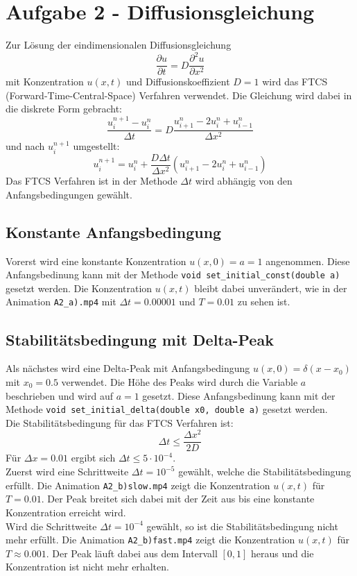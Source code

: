 \section{Aufgabe 2 - Diffusionsgleichung}
\label{sec:A2}
Zur Lösung der eindimensionalen Diffusionsgleichung
\begin{equation}
    \frac{\partial u}{\partial t} = D \frac{\partial^2 u}{\partial x^2}
\end{equation}
mit Konzentration $u(x,t)$ und Diffusionskoeffizient $D=1$ wird das FTCS (Forward-Time-Central-Space) Verfahren verwendet.
Die Gleichung wird dabei in die diskrete Form gebracht:
\begin{equation}
    \frac{u_{i}^{n+1}-u_{i}^{n}}{\Delta t} = D \frac{u_{i+1}^{n}-2u_{i}^{n}+u_{i-1}^{n}}{\Delta x^2}
\end{equation}
und nach $u_{i}^{n+1}$ umgestellt:
\begin{equation}
    u_{i}^{n+1} = u_{i}^{n} + \frac{D \Delta t}{\Delta x^2} (u_{i+1}^{n}-2u_{i}^{n}+u_{i-1}^{n})
\end{equation}
Das FTCS Verfahren ist in der Methode $\Delta t$ wird abhängig von den Anfangsbedingungen gewählt.

\subsection{Konstante Anfangsbedingung}
Vorerst wird eine konstante Konzentration $u(x,0)=a=1$ angenommen.
Diese Anfangsbedinung kann mit der Methode \texttt{void set\_initial\_const(double a)} gesetzt werden.
Die Konzentration $u(x,t)$ bleibt dabei unverändert, wie in der Animation \texttt{A2\_a).mp4} mit $\Delta t = 0.00001$ und $T = 0.01$ zu sehen ist.

\subsection{Stabilitätsbedingung mit Delta-Peak}
Als nächstes wird eine Delta-Peak mit Anfangsbedingung $u(x,0)=\delta(x-x_0)$ mit $x_0=0.5$ verwendet.
Die Höhe des Peaks wird durch die Variable $a$ beschrieben und wird auf $a=1$ gesetzt.
Diese Anfangsbedinung kann mit der Methode \texttt{void set\_initial\_delta(double x0, double a)} gesetzt werden.
\\
Die Stabilitätsbedingung für das FTCS Verfahren ist:
\begin{equation}
    \Delta t \leq \frac{\Delta x^2}{2D}
\end{equation}
Für $\Delta x = 0.01$ ergibt sich $\Delta t \leq 5 \cdot 10^{-4}$.
\\
Zuerst wird eine Schrittweite $\Delta t = 10^{-5}$ gewählt, welche die Stabilitätsbedingung erfüllt.
Die Animation \texttt{A2\_b)slow.mp4} zeigt die Konzentration $u(x,t)$ für $T=0.01$.
Der Peak breitet sich dabei mit der Zeit aus bis eine konstante Konzentration erreicht wird.
\\
Wird die Schrittweite $\Delta t = 10^{-4}$ gewählt, so ist die Stabilitätsbedingung nicht mehr erfüllt.
Die Animation \texttt{A2\_b)fast.mp4} zeigt die Konzentration $u(x,t)$ für $T\approx 0.001$.
Der Peak läuft dabei aus dem Intervall $[0,1]$ heraus und die Konzentration ist nicht mehr erhalten.


